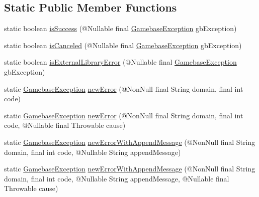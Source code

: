 \subsection*{Static Public Member Functions}
\begin{DoxyCompactItemize}
\item 
static boolean \hyperlink{classcom_1_1toast_1_1android_1_1gamebase_1_1base_1_1_gamebase_error_a7d24434216b8c296f9c1382422267daf}{is\+Success} (@Nullable final \hyperlink{classcom_1_1toast_1_1android_1_1gamebase_1_1base_1_1_gamebase_exception}{Gamebase\+Exception} gb\+Exception)
\item 
static boolean \hyperlink{classcom_1_1toast_1_1android_1_1gamebase_1_1base_1_1_gamebase_error_a19d8ad6593536a494dbf1fbae403779d}{is\+Canceled} (@Nullable final \hyperlink{classcom_1_1toast_1_1android_1_1gamebase_1_1base_1_1_gamebase_exception}{Gamebase\+Exception} gb\+Exception)
\item 
static boolean \hyperlink{classcom_1_1toast_1_1android_1_1gamebase_1_1base_1_1_gamebase_error_aca830b6e975371f5aa1e80562d7b6295}{is\+External\+Library\+Error} (@Nullable final \hyperlink{classcom_1_1toast_1_1android_1_1gamebase_1_1base_1_1_gamebase_exception}{Gamebase\+Exception} gb\+Exception)
\item 
static \hyperlink{classcom_1_1toast_1_1android_1_1gamebase_1_1base_1_1_gamebase_exception}{Gamebase\+Exception} \hyperlink{classcom_1_1toast_1_1android_1_1gamebase_1_1base_1_1_gamebase_error_a2d1d7646a1658d188ee9b65a25905661}{new\+Error} (@Non\+Null final String domain, final int code)
\item 
static \hyperlink{classcom_1_1toast_1_1android_1_1gamebase_1_1base_1_1_gamebase_exception}{Gamebase\+Exception} \hyperlink{classcom_1_1toast_1_1android_1_1gamebase_1_1base_1_1_gamebase_error_a65b209f183118b929f313eedbadcfc71}{new\+Error} (@Non\+Null final String domain, final int code, @Nullable final Throwable cause)
\item 
static \hyperlink{classcom_1_1toast_1_1android_1_1gamebase_1_1base_1_1_gamebase_exception}{Gamebase\+Exception} \hyperlink{classcom_1_1toast_1_1android_1_1gamebase_1_1base_1_1_gamebase_error_a2ed49c27d7a237cd7fcdaa43604c9615}{new\+Error\+With\+Append\+Message} (@Non\+Null final String domain, final int code, @Nullable String append\+Message)
\item 
static \hyperlink{classcom_1_1toast_1_1android_1_1gamebase_1_1base_1_1_gamebase_exception}{Gamebase\+Exception} \hyperlink{classcom_1_1toast_1_1android_1_1gamebase_1_1base_1_1_gamebase_error_a6aa42722f0af25a63811f924fd940552}{new\+Error\+With\+Append\+Message} (@Non\+Null final String domain, final int code, @Nullable String append\+Message, @Nullable final Throwable cause)

\end{DoxyCompactItemize}
